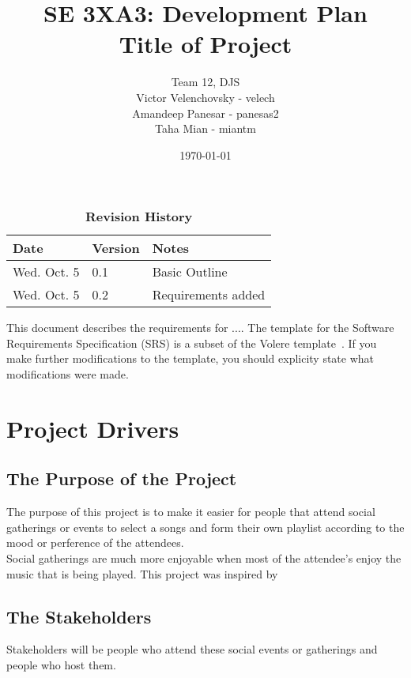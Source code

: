 \documentclass[12pt, titlepage]{article}
\title{SE 3XA3: Development Plan\\Title of Project}
\author{Team 12, DJS
	\\ Victor Velenchovsky - velech
	\\ Amandeep Panesar - panesas2
	\\ Taha Mian - miantm
}
\date{\today}
\begin{document}
\maketitle

\tableofcontents
\listoftables
\listoffigures

\begin{table}[bp]
\caption{\bf Revision History}
\begin{tabularx}{\textwidth}{p{3cm}p{2cm}X}
\toprule {\bf Date} & {\bf Version} & {\bf Notes}\\
\midrule
Wed. Oct. 5 & 0.1 & Basic Outline\\
Wed. Oct. 5 & 0.2 & Requirements added\\
\bottomrule
\end{tabularx}
\end{table}

\newpage


This document describes the requirements for ....  The template for the Software
Requirements Specification (SRS) is a subset of the Volere
template~\citep{RobertsonAndRobertson2012}.  If you make further modifications
to the template, you should explicity state what modifications were made.

\section{Project Drivers}

\subsection{The Purpose of the Project}
The purpose of this project is to make it easier for people that attend social
gatherings or events to select a songs and form their own playlist according to
the mood or perference of the attendees. \\

Social gatherings are much more enjoyable when most of the attendee's enjoy
the music that is being played. This project was inspired by \\

\subsection{The Stakeholders}
Stakeholders will be people who attend these social events or gatherings and
people who host them. \\
\end{document}
